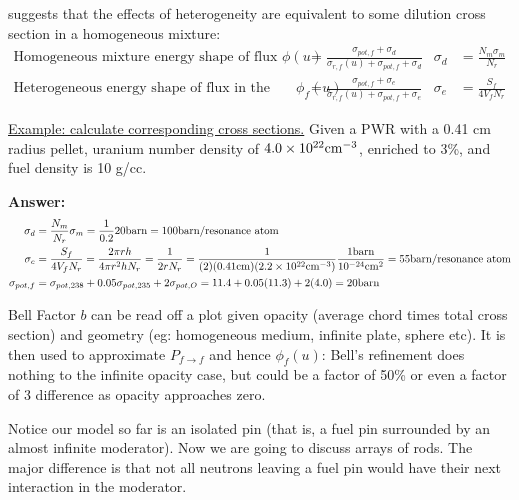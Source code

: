 \documentclass{school-22.211-notes}
\begin{document}
 suggests that the effects of heterogeneity are equivalent to some dilution cross section in a homogeneous mixture:
\begin{align}
\mbox{Homogeneous mixture energy shape of flux } \phi(u) &= \frac{\sigma_{pot, f} + \sigma_d}{\sigma_{r,f} (u) + \sigma_{pot, f} + \sigma_d}   & \sigma_d &= \frac{N_m \sigma_m}{N_r}  \\
\mbox{Heterogeneous energy shape of flux in the fuel } \phi_f(u) &= \frac{\sigma_{pot, f} + \sigma_e}{\sigma_{r,f} (u) + \sigma_{pot, f} + \sigma_e}   & \sigma_e &= \frac{S_f}{4 V_f N_r} 
\end{align}

\uline{Example: calculate corresponding cross sections.} Given a PWR with a 0.41 cm radius pellet, uranium number density of $4.0 \times 10^{22} \mathrm{cm}^{-3}$, enriched to 3\%, and fuel density is 10 g/cc. 

\textbf{Answer:} 
\begin{align}
\sigma_d &= \frac{N_m}{N_r} \sigma_m = \frac{1}{0.2} 20 \mathrm{barn} = 100 \mathrm{barn}/\mbox{resonance atom} \\
\sigma_e &= \frac{S_f}{4 V_f N_r} = \frac{2 \pi r h}{4 \pi r^2 h N_r} = \frac{1}{2 r N_r} = \frac{1}{(2)(0.41 \mathrm{cm})(2.2 \times 10^{22} \mathrm{cm}^{-3})} \frac{1 \mathrm{barn}}{10^{-24} \mathrm{cm}^2} = 55 \mathrm{barn}/\mbox{resonance atom} \\
\sigma_{pot, f} &= \sigma_{pot, 238} + 0.05 \sigma_{pot, 235} + 2 \sigma_{pot, O} = 11.4 + 0.05 (11.3) + 2 (4.0) = 20 \mathrm{barn} 
\end{align} 


Bell Factor $b$ can be read off a plot given opacity (average chord times total cross section) and geometry (eg: homogeneous medium, infinite plate, sphere etc). It is then used to approximate $P_{f\to f}$ and hence $\phi_f(u)$:
Bell's refinement does nothing to the infinite opacity case, but could be a factor of 50\% or even a factor of 3 difference as opacity approaches zero. 

Notice our model so far is an isolated pin (that is, a fuel pin surrounded by an almost infinite moderator). Now we are going to discuss arrays of rods. The major difference is that not all neutrons leaving a fuel pin would have their next interaction in the moderator. 
\end{document}
